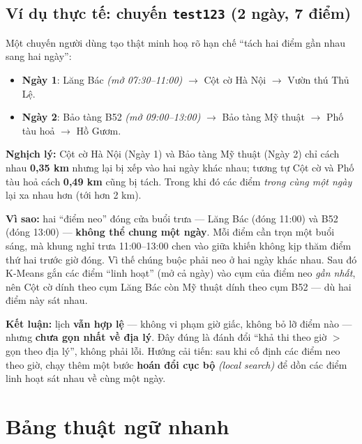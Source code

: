\documentclass[12pt,a4paper]{article}
\newcommand{\en}[1]{\textit{(#1)}}            %
\begin{document}
\subsection*{Ví dụ thực tế: chuyến \texttt{test123} (2 ngày, 7 điểm)}

Một chuyến người dùng tạo thật minh hoạ rõ hạn chế ``tách hai điểm gần nhau sang
hai ngày'':

\begin{itemize}[nosep]
  \item \textbf{Ngày 1}: Lăng Bác \en{mở 07:30--11:00} $\rightarrow$ Cột cờ Hà
  Nội $\rightarrow$ Vườn thú Thủ Lệ.
  \item \textbf{Ngày 2}: Bảo tàng B52 \en{mở 09:00--13:00} $\rightarrow$ Bảo tàng
  Mỹ thuật $\rightarrow$ Phố tàu hoả $\rightarrow$ Hồ Gươm.
\end{itemize}

\textbf{Nghịch lý:} Cột cờ Hà Nội (Ngày 1) và Bảo tàng Mỹ thuật (Ngày 2) chỉ cách
nhau \textbf{0,35 km} nhưng lại bị xếp vào hai ngày khác nhau; tương tự Cột cờ và
Phố tàu hoả cách \textbf{0,49 km} cũng bị tách. Trong khi đó các điểm \emph{trong
cùng một ngày} lại xa nhau hơn (tới hơn 2 km).

\textbf{Vì sao:} hai ``điểm neo'' đóng cửa buổi trưa --- Lăng Bác (đóng 11:00) và
B52 (đóng 13:00) --- \textbf{không thể chung một ngày}. Mỗi điểm cần trọn một buổi
sáng, mà khung nghỉ trưa 11:00--13:00 chen vào giữa khiến không kịp thăm điểm thứ
hai trước giờ đóng. Vì thế chúng buộc phải neo ở hai ngày khác nhau. Sau đó
K-Means gắn các điểm ``linh hoạt'' (mở cả ngày) vào cụm của điểm neo \emph{gần
nhất}, nên Cột cờ dính theo cụm Lăng Bác còn Mỹ thuật dính theo cụm B52 --- dù hai
điểm này sát nhau.

\textbf{Kết luận:} lịch \textbf{vẫn hợp lệ} --- không vi phạm giờ giấc, không bỏ
lỡ điểm nào --- nhưng \textbf{chưa gọn nhất về địa lý}. Đây đúng là đánh đổi
``khả thi theo giờ $>$ gọn theo địa lý'', không phải lỗi. Hướng cải tiến: sau khi
cố định các điểm neo theo giờ, chạy thêm một bước \textbf{hoán đổi cục bộ}
\en{local search} để dồn các điểm linh hoạt sát nhau về cùng một ngày.

\section{Bảng thuật ngữ nhanh}
\end{document}

